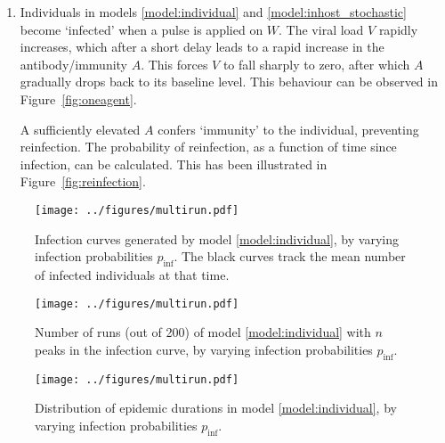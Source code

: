 \documentclass[11pt]{article}
\numberwithin{equation}{subsection}
\begin{document}
\begin{enumerate}
        \item Individuals in models \ref{model:individual} and
        \ref{model:inhost_stochastic} become `infected' when a pulse is
        applied on $W$. The viral load $V$ rapidly increases, which after a
        short delay leads to a rapid increase in the antibody/immunity $A$.
        This forces $V$ to fall sharply to zero, after which $A$ gradually
        drops back to its baseline level. This behaviour can be observed in
        Figure~\ref{fig:oneagent}.

        A sufficiently elevated $A$ confers `immunity' to the individual,
        preventing reinfection. The probability of reinfection, as a function
        of time since infection, can be calculated. This has been illustrated
        in Figure~\ref{fig:reinfection}.
    \end{enumerate}


    \begin{figure}[h!]
    \begin{center}
        \texttt{[image: ../figures/multirun.pdf]}
    \end{center}
    \caption{
        Infection curves generated by model \ref{model:individual}, by varying
        infection probabilities $p_\text{inf}$. The black curves track the
        mean number of infected individuals at that time.
    }
    \label{fig:multiruns}
    \end{figure}


    \begin{figure}[h!]
    \begin{center}
        \texttt{[image: ../figures/multirun.pdf]}
    \end{center}
    \caption{
        Number of runs (out of 200) of model \ref{model:individual} with $n$
        peaks in the infection curve, by varying infection probabilities
        $p_\text{inf}$.
    }
    \label{fig:peaks}
    \end{figure}

    \begin{figure}[h!]
    \begin{center}
        \texttt{[image: ../figures/multirun.pdf]}
    \end{center}
    \caption{
        Distribution of epidemic durations in model \ref{model:individual}, by
        varying infection probabilities $p_\text{inf}$.
    }
    \label{fig:durations}
    \end{figure}

    \nocite{*}

    \printbibliography
\end{document}
